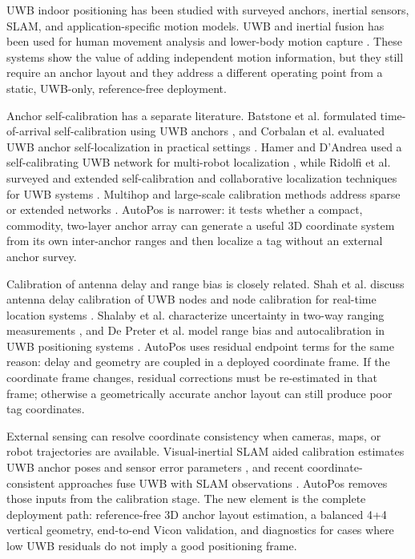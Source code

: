 \documentclass[journal,twoside,web]{ieeecolor}
\begin{document}
UWB indoor positioning has been studied with surveyed anchors, inertial sensors, SLAM, and application-specific motion models. UWB and inertial fusion has been used for human movement analysis and lower-body motion capture \cite{kok_2015,zihajehzadeh_2017,yogesh_2023}. These systems show the value of adding independent motion information, but they still require an anchor layout and they address a different operating point from a static, UWB-only, reference-free deployment.

Anchor self-calibration has a separate literature. Batstone et al. formulated time-of-arrival self-calibration using UWB anchors \cite{batstone_2017}, and Corbalan et al. evaluated UWB anchor self-localization in practical settings \cite{corbalan_2023}. Hamer and D'Andrea used a self-calibrating UWB network for multi-robot localization \cite{hamer_2018}, while Ridolfi et al. surveyed and extended self-calibration and collaborative localization techniques for UWB systems \cite{ridolfi_2021}. Multihop and large-scale calibration methods address sparse or extended networks \cite{herbruggen_2023,yuan_2024}. AutoPos is narrower: it tests whether a compact, commodity, two-layer anchor array can generate a useful 3D coordinate system from its own inter-anchor ranges and then localize a tag without an external anchor survey.

Calibration of antenna delay and range bias is closely related. Shah et al. discuss antenna delay calibration of UWB nodes and node calibration for real-time location systems \cite{shah_2021,shah_2022}. Shalaby et al. characterize uncertainty in two-way ranging measurements \cite{shalaby_2023}, and De Preter et al. model range bias and autocalibration in UWB positioning systems \cite{de_preter_2019}. AutoPos uses residual endpoint terms for the same reason: delay and geometry are coupled in a deployed coordinate frame. If the coordinate frame changes, residual corrections must be re-estimated in that frame; otherwise a geometrically accurate anchor layout can still produce poor tag coordinates.

External sensing can resolve coordinate consistency when cameras, maps, or robot trajectories are available. Visual-inertial SLAM aided calibration estimates UWB anchor poses and sensor error parameters \cite{lutz_2019}, and recent coordinate-consistent approaches fuse UWB with SLAM observations \cite{nguyen_2025}. AutoPos removes those inputs from the calibration stage. The new element is the complete deployment path: reference-free 3D anchor layout estimation, a balanced 4+4 vertical geometry, end-to-end Vicon validation, and diagnostics for cases where low UWB residuals do not imply a good positioning frame.
\end{document}
